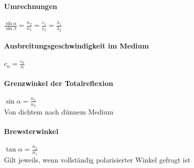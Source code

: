 \documentclass[a4paper, 12pt]{scrreprt}
\begin{document}
\paragraph{Umrechnungen} \dotfill \(\frac{\sin \alpha}{\sin \beta} = \frac{n_2}{n_1} = \frac{c_1}{c_2} = \frac{\lambda_1}{\lambda_2}\)\\
\myhspace {}
\paragraph{Ausbreitungsgeschwindigkeit im Medium} \dotfill \(c_n = \frac{c_0}{n}\)
\paragraph{Grenzwinkel der Totalreflexion} \dotfill \(\sin \alpha = \frac{n_1}{n_2}\)\\
\myhspace Von dichtem nach dünnem Medium
\paragraph{Brewsterwinkel} \dotfill \(\tan \alpha = \frac{n_2}{n_1}\)\\
\myhspace Gilt jeweils, wenn vollständig polarisierter Winkel gefragt ist\\
\myhspace {}\\
\myhspace {}
\end{document}
